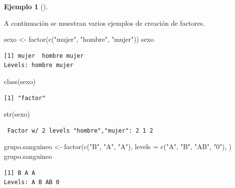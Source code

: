 \documentclass[
  a4paper,
]{scrreport}
\newenvironment{Shaded}{\begin{snugshade}}{\end{snugshade}}
\newcommand{\AttributeTok}[1]{\textcolor[rgb]{0.40,0.45,0.13}{#1}}
\newcommand{\FunctionTok}[1]{\textcolor[rgb]{0.28,0.35,0.67}{#1}}
\newcommand{\NormalTok}[1]{\textcolor[rgb]{0.00,0.23,0.31}{#1}}
\newcommand{\OtherTok}[1]{\textcolor[rgb]{0.00,0.23,0.31}{#1}}
\newcommand{\StringTok}[1]{\textcolor[rgb]{0.13,0.47,0.30}{#1}}
\theoremstyle{definition}
\theoremstyle{definition}
\newtheorem{example}{Ejemplo}[chapter]
\theoremstyle{remark}
\begin{document}
\leavevmode{}%
\begin{example}[]\label{exm-creacion-factores}

A continuación se muestran varios ejemplos de creación de factores.

\begin{Shaded}
\begin{Highlighting}[]
\NormalTok{sexo }\OtherTok{\textless{}{-}} \FunctionTok{factor}\NormalTok{(}\FunctionTok{c}\NormalTok{(}\StringTok{"mujer"}\NormalTok{, }\StringTok{"hombre"}\NormalTok{, }\StringTok{"mujer"}\NormalTok{))}
\NormalTok{sexo}
\end{Highlighting}
\end{Shaded}

\begin{verbatim}
[1] mujer  hombre mujer 
Levels: hombre mujer
\end{verbatim}

\begin{Shaded}
\begin{Highlighting}[]
\FunctionTok{class}\NormalTok{(sexo)}
\end{Highlighting}
\end{Shaded}

\begin{verbatim}
[1] "factor"
\end{verbatim}

\begin{Shaded}
\begin{Highlighting}[]
\FunctionTok{str}\NormalTok{(sexo)}
\end{Highlighting}
\end{Shaded}

\begin{verbatim}
 Factor w/ 2 levels "hombre","mujer": 2 1 2
\end{verbatim}

\begin{Shaded}
\begin{Highlighting}[]
\NormalTok{grupo.sanguineo }\OtherTok{\textless{}{-}} \FunctionTok{factor}\NormalTok{(}\FunctionTok{c}\NormalTok{(}\StringTok{"B"}\NormalTok{, }\StringTok{"A"}\NormalTok{, }\StringTok{"A"}\NormalTok{), }\AttributeTok{levels =} \FunctionTok{c}\NormalTok{(}\StringTok{"A"}\NormalTok{, }\StringTok{"B"}\NormalTok{, }\StringTok{"AB"}\NormalTok{, }\StringTok{"0"}\NormalTok{), )}
\NormalTok{grupo.sanguineo}
\end{Highlighting}
\end{Shaded}

\begin{verbatim}
[1] B A A
Levels: A B AB 0
\end{verbatim}

\end{example}
\end{document}
